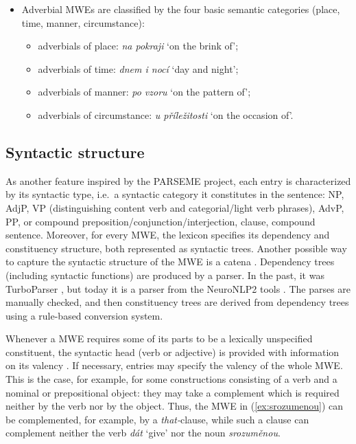 \documentclass[output=paper,colorlinks,citecolor=brown]{langscibook}
\begin{document}
\begin{itemize}
\item Adverbial MWEs are classified  by the four basic
semantic categories (place, time, manner, circumstance):
\begin{itemize}
    \item  adverbials of place: \emph{na pokraji} ‘on the brink of’;
    
    \item  adverbials of time: \emph{dnem i nocí} ‘day and night’;
      
    \item adverbials of manner: \emph{po vzoru} ‘on the pattern of’;
   
    \item  adverbials of circumstance: \emph{u příležitosti} ‘on the occasion of’.

\end{itemize}
\end{itemize}


\subsection{Syntactic structure}
\label{sec:syntstruct}

As another feature inspired by the PARSEME project, each entry is characterized by its syntactic type, i.e.\ a syntactic category it constitutes in the sentence: NP, AdjP, VP (distinguishing content verb and categorial\slash light verb phrases), 
AdvP, PP, or compound preposition\slash conjunction\slash interjection, clause, compound sentence. Moreover, for every MWE, the lexicon specifies its dependency and constituency structure, both represented as syntactic trees. Another possible way to capture the syntactic structure of the MWE is a catena .
Dependency trees (including syntactic functions) are produced by a parser. In the past, it was TurboParser \citep{Martins:etal:2013}, but today it is a parser from the NeuroNLP2 tools \citep{Ma:etal:2018}. The parses are
manually checked, and then constituency trees are derived from dependency trees using a rule-based conversion system.

Whenever a MWE requires some of its parts to be a lexically unspecified constituent, the syntactic head (verb or adjective) is provided with information on its valency \citep{Rosen:Skoumalova:2018}.
If necessary, entries may specify the valency of the whole MWE.
This is the case, for example, for some constructions consisting of a verb and a nominal or prepositional object:  they may take a complement which is required neither by the verb nor by the object. Thus, the MWE in (\ref{ex:srozumenou}) can be complemented, for example, by a \emph{that-}clause, while such a clause can complement neither the verb \emph{dát} ‘give’ nor the noun \emph{srozuměnou}.
 
\end{document}

